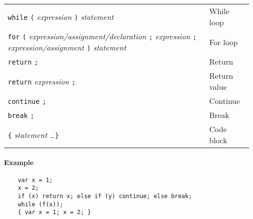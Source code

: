 \begin{table}[H]
\begin{tabular}{ m{225pt} l }
        \verb|while| \verb|(| \textit{expression} \verb|)| \textit{statement}                                                                                                                                           & While loop                  \\
        \verb|for| \verb|(| \textit{expression/assignment/declaration} \verb|;| \newline \hspace*{29pt} \textit{expression} \verb|;| \textit{expression/assignment} \verb|)| \newline \hspace*{29pt} \textit{statement} & For loop                    \\
        \verb|return| \verb|;|                                                                                                                                                                                          & Return                      \\
        \verb|return| \textit{expression} \verb|;|                                                                                                                                                                      & Return value                \\
        \verb|continue| \verb|;|                                                                                                                                                                                        & Continue                    \\
        \verb|break| \verb|;|                                                                                                                                                                                           & Break                       \\
        \verb|{| \textit{statement} \ldots \verb|}|                                                                                                                                                                     & Code block                  \\
    \end{tabular}
\end{table}

\paragraph{Example}

\begin{verbatim}
    var x = 1;
    x = 2;
    if (x) return x; else if (y) continue; else break;
    while (f(x));
    { var x = 1; x = 2; }
\end{verbatim}

